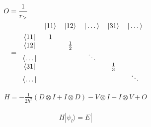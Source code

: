 \documentclass{article}
\begin{document}
\begin{align*}
  O&=\frac{1}{r_>}\\
  &=\begin{tabular}{c @{\hspace{2\tabcolsep}} *{5}{c}}
  &
  \itshape $|11\rangle$ &
  \itshape $|12\rangle$ &
    \itshape $|\dots\rangle$ &
    \itshape $|31\rangle$ & 
  \itshape $|\dots\rangle$ 
\\[1ex]
    \bfseries $\langle 11 |$& 1 & & & &\\
    \bfseries $\langle 12 |$& & $\frac{1}{2}$ & & &\\
    \bfseries $\langle \dots |$& & & $\ddots$ & &\\
    \bfseries $\langle 31 |$& & & & $\frac{1}{3}$ &\\
    \bfseries $\langle \dots |$& & & & & $\ddots$
  \end{tabular}
\end{align*}

\begin{align*}
  H=-\frac{1}{2h^2}(D\otimes I + I\otimes D) - V\otimes I -I\otimes V + O 
\end{align*}

\begin{align*}
  H|\psi_l\rangle=E|
\end{align*}
\end{document}
